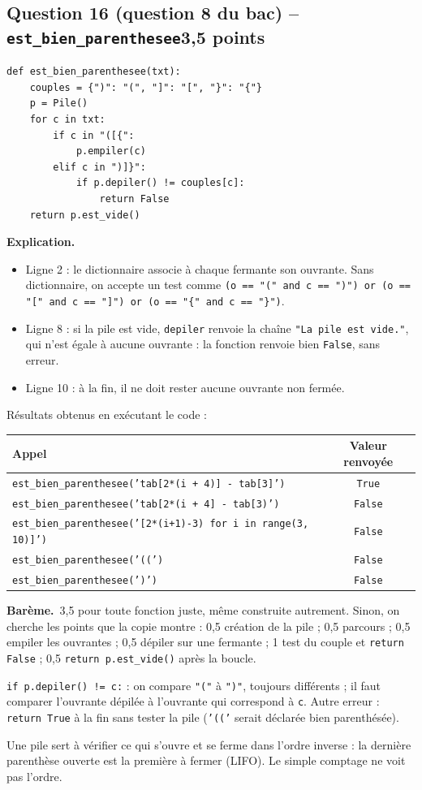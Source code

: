 \documentclass[11pt, a4paper]{exam}
\newcommand{\code}[1]{\texttt{#1}}
\newcommand{\Qt}[2]{\par\needspace{10\baselineskip}\subsection*{#1\hfill{\normalfont\small #2}}}
\newcommand{\bareme}[1]{\par\noindent\textbf{Barème.}\ #1\par\smallskip}
\newcommand{\explication}{\noindent\textbf{Explication.}\ }
\begin{document}
\Qt{Question 16 (question 8 du bac) -- \code{est\_bien\_parenthesee}}{3,5 points}
\begin{reponse}
\begin{lstlisting}
def est_bien_parenthesee(txt):
    couples = {")": "(", "]": "[", "}": "{"}
    p = Pile()
    for c in txt:
        if c in "([{":
            p.empiler(c)
        elif c in ")]}":
            if p.depiler() != couples[c]:
                return False
    return p.est_vide()
\end{lstlisting}
\end{reponse}
\explication
\begin{itemize}
\item Ligne 2 : le dictionnaire associe à chaque fermante son ouvrante. Sans dictionnaire, on accepte un test comme \code{(o == "(" and c == ")") or (o == "[" and c == "]") or (o == "\{" and c == "\}")}.
\item Ligne 8 : si la pile est vide, \code{depiler} renvoie la chaîne \code{"La pile est vide."}, qui n'est égale à aucune ouvrante : la fonction renvoie bien \code{False}, sans erreur.
\item Ligne 10 : à la fin, il ne doit rester aucune ouvrante non fermée.
\end{itemize}
Résultats obtenus en exécutant le code :
\begin{center}\small
\begin{tabular}{|l|c|}\hline
Appel & Valeur renvoyée \\\hline
\code{est\_bien\_parenthesee('tab[2*(i + 4)] - tab[3]')} & \code{True} \\\hline
\code{est\_bien\_parenthesee('tab[2*(i + 4] - tab[3)')} & \code{False} \\\hline
\code{est\_bien\_parenthesee('[2*(i+1)-3) for i in range(3, 10)]')} & \code{False} \\\hline
\code{est\_bien\_parenthesee('((')} & \code{False} \\\hline
\code{est\_bien\_parenthesee(')')} & \code{False} \\\hline
\end{tabular}
\end{center}
\bareme{3,5 pour toute fonction juste, même construite autrement. Sinon, on cherche les points que la copie montre : 0,5 création de la pile ; 0,5 parcours ; 0,5 empiler les ouvrantes ; 0,5 dépiler sur une fermante ; 1 test du couple et \code{return False} ; 0,5 \code{return p.est\_vide()} après la boucle.}
\begin{erreur}
\code{if p.depiler() != c:} : on compare \code{"("} à \code{")"}, toujours différents ; il faut comparer l'ouvrante dépilée à l'ouvrante qui correspond à \code{c}. Autre erreur : \code{return True} à la fin sans tester la pile (\code{'(('} serait déclarée bien parenthésée).
\end{erreur}

\begin{retenir}
Une pile sert à vérifier ce qui s'ouvre et se ferme dans l'ordre inverse : la dernière parenthèse ouverte est la première à fermer (LIFO). Le simple comptage ne voit pas l'ordre.
\end{retenir}
\end{document}
